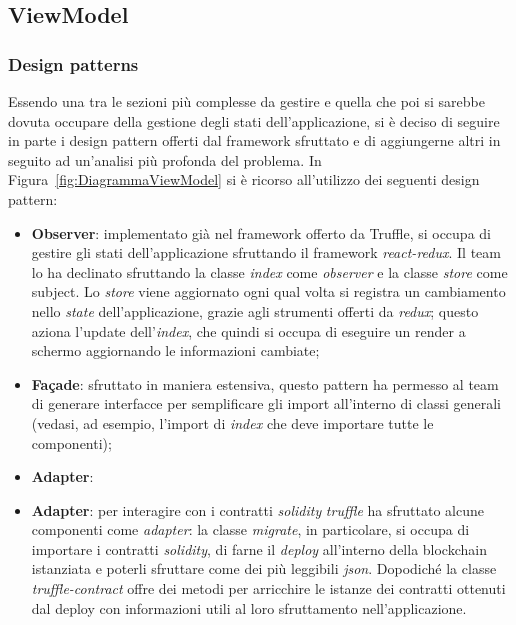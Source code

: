 
	
	\subsection{ViewModel}
		\subsubsection{Design patterns}
		Essendo una tra le sezioni più complesse da gestire e quella che poi si sarebbe dovuta occupare della gestione degli stati dell'applicazione, si è deciso di seguire in parte i design pattern offerti dal framework sfruttato e di aggiungerne altri in seguito ad un'analisi più profonda del problema.
		In Figura~\ref{fig:DiagrammaViewModel} si è ricorso all'utilizzo dei seguenti design pattern:
			\begin{itemize}
				\item \textbf{Observer}: implementato già nel framework offerto da Truffle, si occupa di gestire gli stati dell'applicazione sfruttando il framework \emph{react-redux}. Il team lo ha declinato sfruttando la classe \emph{index} come \emph{observer} e la classe \emph{store} come subject. Lo \emph{store} viene aggiornato ogni qual volta si registra un cambiamento nello \emph{state} dell'applicazione, grazie agli strumenti offerti da \emph{redux}; questo aziona l'update dell'\emph{index}, che quindi si occupa di eseguire un render a schermo aggiornando le informazioni cambiate;
				\item \textbf{Fa\c{c}ade}: sfruttato in maniera estensiva, questo pattern ha permesso al team di generare interfacce per semplificare gli import all'interno di classi generali (vedasi, ad esempio, l'import di \emph{index} che deve importare tutte le componenti);
				\item \textbf{Adapter}:\item \textbf{Adapter}: per interagire con i contratti \emph{solidity} \emph{truffle} ha sfruttato alcune componenti come \emph{adapter}: la classe \emph{migrate}, in particolare, si occupa di importare i contratti \emph{solidity}, di farne il \emph{deploy} all'interno della blockchain istanziata e poterli sfruttare come dei più leggibili \emph{json}. Dopodiché la classe \emph{truffle-contract} offre dei metodi per arricchire le istanze dei contratti ottenuti dal deploy con informazioni utili al loro sfruttamento nell'applicazione.
			\end{itemize}
